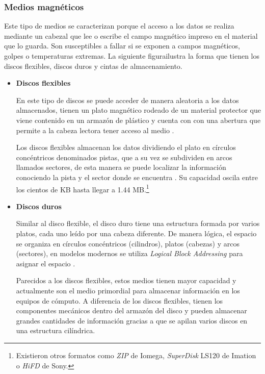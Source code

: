 \newpage
      \subsubsection*{Medios magn\'{e}ticos}

Este tipo de medios se caracterizan porque el acceso a los datos se realiza mediante un cabezal que lee o escribe el campo magn\'{e}tico impreso en el material que lo guarda. Son susceptibles a fallar si se exponen a campos magn\'{e}ticos, golpes o temperaturas extremas. La siguiente figurailustra la forma que tienen los discos flexibles, discos duros y cintas de almacenamiento.

\begin{itemize}
  \item \textbf{Discos flexibles}

En este tipo de discos se puede acceder de manera aleatoria a los datos almacenados, tienen un plato magn\'{e}tico rodeado de un material protector que viene contenido en un armaz\'{o}n de pl\'{a}stico y cuenta con con una abertura que permite a la cabeza lectora tener acceso al medio \cite{_anatomy_????}.

Los discos flexibles almacenan los datos dividiendo el plato en c\'{i}rculos conc\'{e}ntricos denominados pistas, que a su vez se subdividen en arcos llamados sectores, de esta manera se puede localizar la informaci\'{o}n conociendo la pista y el sector donde se encuentra \cite{_illustrated_????}. Su capacidad oscila entre los cientos de \textsc{\gls{KB}} hasta llegar a 1.44 \textsc{\gls{MB}}.\footnote{Existieron otros formatos como \textit{ZIP} de Iomega, \textit{SuperDisk} LS120 de Imation o \textit{HiFD} de Sony.}

  \item \textbf{Discos duros}

Similar al disco flexible, el disco duro tiene una estructura formada por varios platos, cada uno le\'{i}do por una cabeza diferente. De manera l\'{o}gica, el espacio se organiza en c\'{i}rculos conc\'{e}ntricos (cilindros), platos (cabezas) y arcos (sectores), en modelos modernos se utiliza \emph{Logical Block Addressing} para asignar el espacio \cite{_introduction_????}.

Parecidos a los discos flexibles, estos medios tienen mayor capacidad y actualmente son el medio primordial para almacenar informaci\'{o}n en los equipos de c\'{o}mputo. A diferencia de los discos flexibles, tienen los componentes mec\'{a}nicos dentro del armaz\'{o}n del disco y pueden almacenar grandes cantidades de informaci\'{o}n gracias a que se apilan varios discos en una estructura cil\'{i}ndrica.


\end{itemize}
